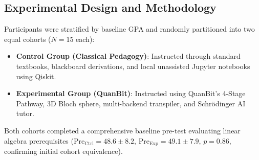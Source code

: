 \documentclass[conference]{IEEEtran}
\begin{document}
\subsection{Experimental Design and Methodology}
Participants were stratified by baseline GPA and randomly partitioned into two equal cohorts ($N=15$ each):
\begin{itemize}[leftmargin=*,itemsep=2pt]
    \item \textbf{Control Group (Classical Pedagogy)}: Instructed through standard textbooks, blackboard derivations, and local unassisted Jupyter notebooks using Qiskit.
    \item \textbf{Experimental Group (QuanBit)}: Instructed using QuanBit's 4-Stage Pathway, 3D Bloch sphere, multi-backend transpiler, and Schr{\"o}dinger AI tutor.
\end{itemize}
Both cohorts completed a comprehensive baseline pre-test evaluating linear algebra prerequisites ($\text{Pre}_{\text{Ctrl}} = 48.6 \pm 8.2$, $\text{Pre}_{\text{Exp}} = 49.1 \pm 7.9$, $p=0.86$, confirming initial cohort equivalence).

\begin{table}[htbp]
\caption{Quantitative Performance and Learning Efficacy Comparison ($N=30$)}
\label{tab:results}
\centering
\renewcommand{\arraystretch}{1.03}
\end{table}
\end{document}
